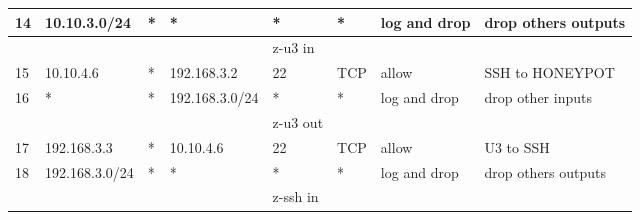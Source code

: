 \documentclass[a4paper, 11pt, oneside]{article}
\begin{document}
\begin{table}[H]
\begin{tabular}{|llllllll|}
  \multicolumn{1}{|l|}{14}           & \multicolumn{1}{l|}{10.10.3.0/24}    & \multicolumn{1}{l|}{*}           & \multicolumn{1}{l|}{*}                    & \multicolumn{1}{l|}{*}           & \multicolumn{1}{l|}{*}                 & \multicolumn{1}{l|}{log and drop}            & drop others outputs \\ \hline
                                    &                                      &                                  &                                           & {\color[HTML]{FE0000} z-u3 in}   &                                        &                                      &                     \\ \hline
  \multicolumn{1}{|l|}{15}           & \multicolumn{1}{l|}{10.10.4.6}       & \multicolumn{1}{l|}{*}           & \multicolumn{1}{l|}{192.168.3.2}          & \multicolumn{1}{l|}{22}          & \multicolumn{1}{l|}{TCP}               & \multicolumn{1}{l|}{allow}           & SSH to HONEYPOT     \\ \hline
  \multicolumn{1}{|l|}{16}           & \multicolumn{1}{l|}{*}               & \multicolumn{1}{l|}{*}           & \multicolumn{1}{l|}{192.168.3.0/24}       & \multicolumn{1}{l|}{*}           & \multicolumn{1}{l|}{*}                 & \multicolumn{1}{l|}{log and drop}            & drop other inputs   \\ \hline
                                    &                                      &                                  &                                           & {\color[HTML]{FE0000} z-u3 out}  &                                        &                                      &                     \\ \hline
  \multicolumn{1}{|l|}{17}          & \multicolumn{1}{l|}{192.168.3.3}  & \multicolumn{1}{l|}{*}           & \multicolumn{1}{l|}{10.10.4.6}                    & \multicolumn{1}{l|}{22}           & \multicolumn{1}{l|}{TCP}                 & \multicolumn{1}{l|}{allow}            & U3 to SSH \\ \hline
  \multicolumn{1}{|l|}{18}          & \multicolumn{1}{l|}{192.168.3.0/24}  & \multicolumn{1}{l|}{*}           & \multicolumn{1}{l|}{*}                    & \multicolumn{1}{l|}{*}           & \multicolumn{1}{l|}{*}                 & \multicolumn{1}{l|}{log and drop}            & drop others outputs \\ \hline
                                    &                                      &                                  &                                           & {\color[HTML]{FE0000} z-ssh in}  &                                        &                                      &                     \\ \hline

\end{tabular}
\end{table}
\end{document}
